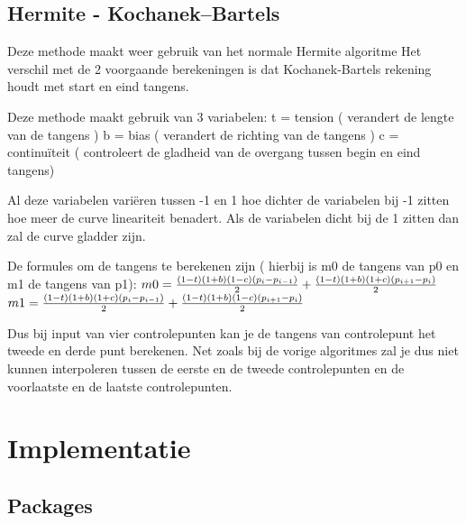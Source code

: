 \documentclass[a4paper,11pt,oneside, titlepage]{article}
\begin{document}
\subsection{Hermite - Kochanek–Bartels}
Deze methode maakt weer gebruik van het normale Hermite algoritme Het verschil
met de 2 voorgaande berekeningen is dat Kochanek-Bartels rekening houdt met start en eind
tangens.

Deze methode maakt gebruik van 3 variabelen:\newline
t = tension ( verandert de lengte van de tangens )\newline
b = bias ( verandert de richting van de tangens )\newline
c = continu\"iteit ( controleert de gladheid van de overgang tussen begin en eind tangens)
\newline

Al deze variabelen vari\"eren tussen -1 en 1 hoe dichter de variabelen bij -1 zitten hoe
meer de curve lineariteit benadert. Als de variabelen dicht bij de 1 zitten dan zal de curve
gladder zijn.\newline

De formules om de tangens te berekenen zijn ( hierbij is m0 de tangens van p0 en m1 de tangens
van p1):\newline
$m0 = {{(1-t)(1+b)(1-c)(p_i-p_{i-1})}\over{2}} + {{(1-t)(1+b)(1+c)(p_{i+1}-p_i)}\over{2}}$\newline
$m1 = {{(1-t)(1+b)(1+c)(p_i-p_{i-1})}\over{2}} + {{(1-t)(1+b)(1-c)(p_{i+1}-p_i)}\over{2}}$\newline

Dus bij input van vier controlepunten kan je de tangens van controlepunt het tweede en derde
punt berekenen. Net zoals bij de vorige algoritmes zal je dus niet kunnen interpoleren tussen
de eerste en de tweede controlepunten en de voorlaatste en de laatste controlepunten.
\newpage
\section{Implementatie}
\subsection{Packages}
\end{document}
